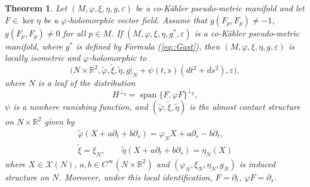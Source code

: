 \documentclass[12pt,a4paper,final]{amsart}
\numberwithin{equation}{section}
\newtheorem{tw}{Theorem}[section]
\theoremstyle{df}
\newcommand{\R}{\mathbb{R}}
\newcommand{\X}{\mathcal{X}}
\newcommand{\Span}{\operatorname{span}}
\newcommand{\eps}{\varepsilon}
\newcommand{\Cniesk}{{C^\infty}}
\begin{document}
\begin{tw}\label{tw::localprod}
Let $(M,\varphi,\xi,\eta,g,\eps)$ be a co-K\"ahler pseudo-metric manifold and
let $F\in\ker\eta$ be a $\varphi$-holomorphic vector field.
Assume that $g(F_p,F_p)\neq -1$, $g(F_p,F_p)\neq 0$ for all $p\in M$.
If $(M,\varphi,\xi,\eta,g^\ast,\eps)$ is a co-K\"ahler pseudo-metric manifold, where
$
g^\ast$ is defined by Formula (\ref{eq::Gast}),
then $(M,\varphi,\xi,\eta,g,\eps)$ is locally isometric and $\varphi$-holomorphic
to
$$
\bigl(N\times \R^2,\widetilde\varphi,\widetilde\xi,\widetilde\eta,
g|_N+\psi(t,s)(dt^2+ds^2),\eps\bigr),
$$
where $N$ is a leaf of the distribution
$$
H^{\perp_g}=\Span\{F,\varphi F\}^{\perp_g},
$$
$\psi$ is a nowhere vanishing function, and
$(\widetilde\varphi,\widetilde\xi,\widetilde\eta)$ is the almost contact
structure on $N\times\R^2$ given by
\begin{align}
\label{eq::inducedvarphi} \widetilde\varphi(X+a\partial_t+b\partial_s)=\varphi_NX+a\partial_s-b\partial_t,\\
\label{eq::inducedxieta} \widetilde\xi=\xi_N,\qquad \widetilde\eta(X+a\partial_t+b\partial_s)=\eta_N(X)
\end{align}
where $X\in\X(N)$, $a,b\in\Cniesk(N\times\R^2)$ and $(\varphi_N,\xi_N,\eta_N,g_N)$ is induced structure on $N$.
Moreover, under this local identification, $F=\partial_t$, $\varphi F=\partial_s$.
\end{tw}
\end{document}
